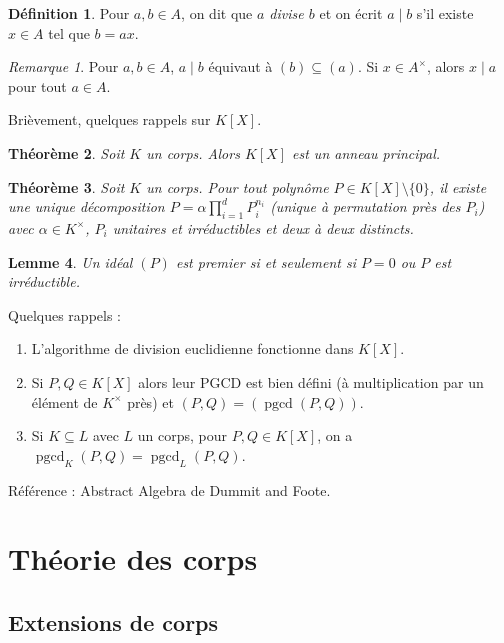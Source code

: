 \documentclass{article}
\DeclareMathOperator{\pgcd}{pgcd}
\theoremstyle{plain}
\newtheorem{theorem}{Théorème}[subsection]
\newtheorem{lemma}[theorem]{Lemme}
\theoremstyle{definition}
\newtheorem{definition}[theorem]{Définition}
\theoremstyle{remark}
\newtheorem*{remark}{Remarque}
\begin{document}
\begin{definition}
    Pour $a,b \in A$, on dit que \emph{$a$ divise $b$} et on écrit $a \mid b$ s'il existe $x\in A$ tel que $b = ax$.
\end{definition}

\begin{remark}
    Pour $a,b \in A$, $a \mid b$ équivaut à $(b) \subseteq (a)$. Si $x \in A^\times$, alors $x \mid a$ pour tout $a \in A$.
\end{remark}

Brièvement, quelques rappels sur $K[X]$.

\begin{theorem}
    Soit $K$ un corps. Alors $K[X]$ est un anneau principal.
\end{theorem}

\begin{theorem}
    Soit $K$ un corps. Pour tout polynôme $P \in K[X] \setminus \{0\}$, il existe une unique décomposition $P = \alpha \prod\limits_{i=1}^d P_i^{n_i}$ (unique à permutation près des $P_i$) avec $\alpha \in K^\times$, $P_i$ unitaires et irréductibles et deux à deux distincts.
\end{theorem}

\begin{lemma}
    Un idéal $(P)$ est premier si et seulement si $P = 0$ ou $P$ est irréductible.
\end{lemma}

Quelques rappels :

\begin{enumerate}
    \item L'algorithme de division euclidienne fonctionne dans $K[X]$.
    \item Si $P,Q \in K[X]$ alors leur PGCD est bien défini (à multiplication par un élément de $K^\times$ près) et $(P,Q) = (\pgcd(P,Q))$.
    \item Si $K \subseteq L$ avec $L$ un corps, pour $P,Q \in K[X]$, on a $\pgcd_K(P,Q) = \pgcd_L (P,Q)$.
\end{enumerate}

Référence : Abstract Algebra de Dummit and Foote.

\section{Théorie des corps}

\subsection{Extensions de corps}
\end{document}
